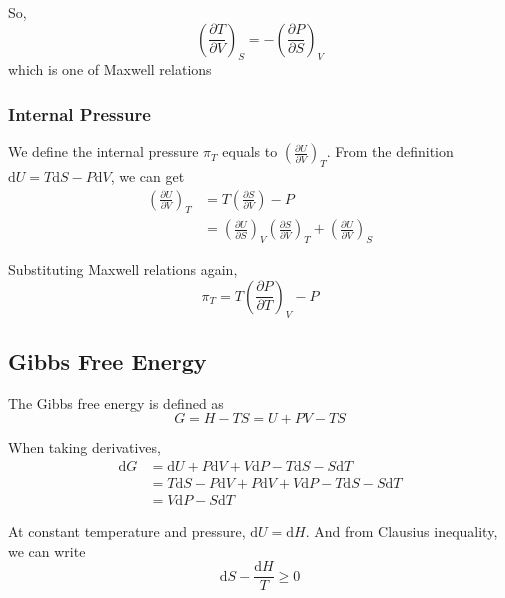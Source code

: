 \documentclass[letterpaper]{article}
\newcommand{\diff}{\mathrm{d}}
\begin{document}
So,
\begin{equation*}
    \left(\frac{\partial T}{\partial V}\right)_S=-\left(\frac{\partial P}{\partial S}\right)_V
\end{equation*}
which is one of Maxwell relations

\subsubsection*{Internal Pressure}
We define the internal pressure $\pi_T$ equals to $(\frac{\partial U}{\partial V})_T$.
From the definition $\diff U=T\diff S-P\diff V$, we can get
\begin{equation*}
    \begin{aligned}
        \left(\frac{\partial U}{\partial V}\right)_T & =T\left(\frac{\partial S}{\partial V}\right)-P \\
                                                     & =\left(\frac{\partial U}{\partial S}\right)_V
        \left(\frac{\partial S}{\partial V}\right)_T+
        \left(\frac{\partial U}{\partial V}\right)_S
    \end{aligned}
\end{equation*}

Substituting Maxwell relations again,
\begin{equation*}
    \pi_T=T\left(\frac{\partial P}{\partial T}\right)_V-P
\end{equation*}

\subsection*{Gibbs Free Energy}
The Gibbs free energy is defined as
\begin{equation*}
    G=H-TS=U+PV-TS
\end{equation*}

When taking derivatives,
\begin{equation*}
    \begin{aligned}
        \diff G & =\diff U+P\diff V+V\diff P-T\diff S-S\diff T           \\
                & =T\diff S-P\diff V+P\diff V+V\diff P-T\diff S-S\diff T \\
                & =V\diff P-S\diff T
    \end{aligned}
\end{equation*}

At constant temperature and pressure, $\diff U=\diff H$.
And from Clausius inequality, we can write
\begin{equation*}
    \diff S-\frac{\diff H}{T}\geq0
\end{equation*}
\end{document}

